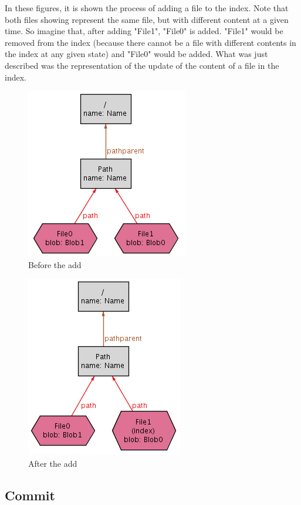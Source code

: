 In these figures, it is shown the process of adding a file to the index. Note
that both files showing represent the same file, but with different content at
a given time. So imagine that, after adding "File1", "File0" is added. "File1"
would be removed from the index (because there cannot be a file with different
contents in the index at any given state) and "File0" would be added. What was
just described was the representation of the update of the content of a file in the
index. \par 
\begin{figure}[h!] 
	\caption{Before the add}
	\centering
	\includegraphics[scale=0.65]{images/add1.png}
\end{figure}

\begin{figure}[h!] 
	\caption{After the add}
	\centering
	\includegraphics[scale=0.65]{images/add2.png}
\end{figure}

\pagebreak


\subsection{Commit}

